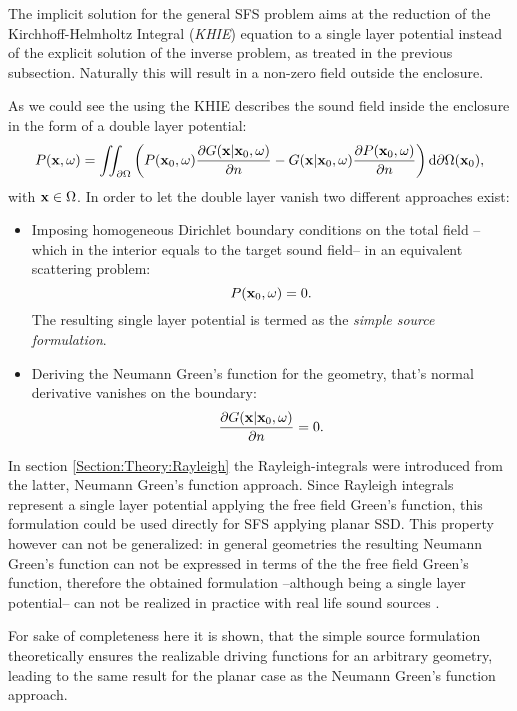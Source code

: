 The implicit solution for the general SFS problem aims at the reduction of the Kirchhoff-Helmholtz Integral (\emph{KHIE}) equation to a single layer potential instead of the explicit solution of the inverse problem, as treated in the previous subsection. Naturally this will result in a non-zero field outside the enclosure.

As we could see the using the KHIE describes the sound field inside the enclosure in the form of a double layer potential:
\begin{equation}
P(\mathbf{x},\omega) = 
\iint_{\partial \Omega}  \left( 
P(\mathbf{x}_0,\omega)  \frac{\partial G(\mathbf{x}|\mathbf{x}_0,\omega)}{\partial n}  -  
G(\mathbf{x}|\mathbf{x}_0,\omega) \frac{\partial P(\mathbf{x}_0,\omega)}{\partial n} 
\right)   \mathrm{d} \partial \Omega ( \mathbf{x}_0),
\end{equation}
with $\mathbf{x} \in \Omega$.
In order to let the double layer vanish two different approaches exist:
\begin{itemize}
\item Imposing homogeneous Dirichlet boundary conditions on the total field --which in the interior equals to the target sound field-- in an equivalent scattering problem: 
\begin{equation}
P(\mathbf{x}_0,\omega) = 0.
\end{equation}
The resulting single layer potential is termed as the \emph{simple source formulation}.
\item Deriving the Neumann Green's function for the geometry, that's normal derivative vanishes on the boundary:
\begin{equation}
\frac{\partial G(\mathbf{x}|\mathbf{x}_0,\omega)}{\partial n}  = 0.
\end{equation}
\end{itemize}
In section \ref{Section:Theory:Rayleigh} the Rayleigh-integrals were introduced from the latter, Neumann Green's function approach. Since Rayleigh integrals represent a single layer potential applying the free field Green's function, this formulation could be used directly for SFS applying planar SSD. 
This property however can not be generalized: in general geometries the resulting Neumann Green's function can not be expressed in terms of the the free field Green's function, therefore the obtained formulation --although being a single layer potential-- can not be realized in practice with real life sound sources \cite{Schultz2014:Comparing_approaches}.

For sake of completeness here it is shown, that the simple source formulation theoretically ensures the realizable driving functions for an arbitrary geometry, leading to the same result for the planar case as the Neumann Green's function approach.

